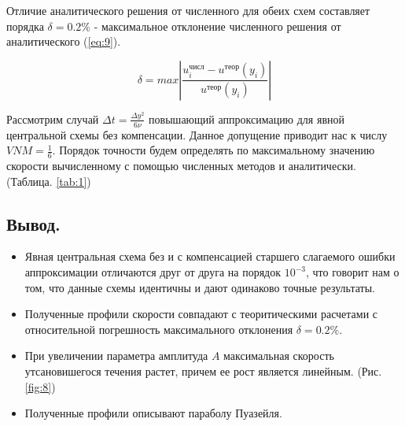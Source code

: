 Отличие аналитического решения от численного для обеих схем составляет порядка $\delta = 0.2\%$ - максимальное отклонение численного решения от аналитического (\ref{eq:9}).

\begin{equation}
    \delta = max\left| \frac{u_i^\text{числ}-u^\text{теор}(y_i)}{u^\text{теор}(y_i)}\right|
\label{eq:9}
\end{equation}

Рассмотрим случай $\Delta t = \frac{\Delta y^2}{6\nu}$ повышающий аппроксимацию для явной центральной схемы без компенсации. Данное допущение приводит нас к числу $VNM=\frac{1}{6}$. Порядок точности будем определять по максимальному значению скорости вычисленному с помощью численных методов и аналитически.  (Таблица. \ref{tab:1})

\begin{table}[H]
    \centering
\caption{Сравнение точности повышающего порядок аппроксимации схемы.}
\label{tab:1}
\end{table}


\subsection{Вывод.}
\begin{itemize}
    \item Явная центральная схема без и с компенсацией старшего слагаемого ошибки аппроксимации отличаются друг от друга на порядок $10^{-3}$, что говорит нам о том, что данные схемы идентичны и дают одинаково точные результаты.
    \item Полученные профили скорости совпадают с теоритическими расчетами с относительной погрешность максимального отклонения $\delta = 0.2\%$.
    \item При увеличении параметра амплитуда $A$ максимальная скорость утсановишегося течения растет, причем ее рост является линейным. (Рис. \ref{fig:8})
    \item Полученные профили описывают параболу Пуазейля.
\end{itemize}

